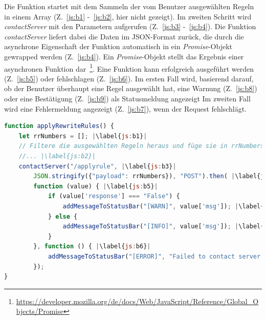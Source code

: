 Die Funktion startet mit dem Sammeln der vom Benutzer ausgewählten Regeln in einem Array (Z.~\ref{js:b1} -~\ref{js:b2}, hier nicht gezeigt).
Im zweiten Schritt wird \textit{contactServer} mit den Parametern aufgerufen (Z.~\ref{js:b3} -~\ref{js:b4}).
Die Funktion \textit{contactServer} liefert dabei die Daten im JSON-Format zurück, die durch die asynchrone Eigenschaft der Funktion automatisch in ein \textit{Promise}-Objekt gewrapped werden (Z.~\ref{js:b4}).
Ein \textit{Promise}-Objekt stellt das Ergebnis einer asynchronen Funktion dar~\footnote{\hspace{1.5mm}\url{https://developer.mozilla.org/de/docs/Web/JavaScript/Reference/Global_Objects/Promise}}.
Eine Funktion kann erfolgreich ausgeführt werden (Z.~\ref{js:b5}) oder fehlschlagen (Z.~\ref{js:b6}). Im ersten Fall wird, basierend darauf, ob der Benutzer überhaupt eine Regel ausgewählt hat,
eine Warnung (Z.~\ref{js:b8}) oder eine Bestätigung (Z.~\ref{js:b9}) als Statusmeldung angezeigt
Im zweiten Fall wird eine Fehlermeldung angezeigt (Z.~\ref{js:b7}), wenn der Request fehlschlägt.

\begin{lstlisting}[language=JavaScript, escapechar=|, caption=Funktion \textit{applyRewriteRules()} aus der Datei \textit{index.js}, label={lst:apply}]
function applyRewriteRules() {
    let rrNumbers = []; |\label{js:b1}|
    // Filtere die ausgewählten Regeln heraus und füge sie in rrNumbers ein
    //... |\label{js:b2}|
    contactServer("/applyrule", |\label{js:b3}|
        JSON.stringify({"payload": rrNumbers}), "POST").then( |\label{js:b4}|
        function (value) { |\label{js:b5}|
            if (value['response'] === "False") {
                addMessageToStatusBar("[WARN]", value['msg']); |\label{js:b8}|
            } else {
                addMessageToStatusBar("[INFO]", value['msg']); |\label{js:b9}|
            }
        }, function () { |\label{js:b6}|
            addMessageToStatusBar("[ERROR]", "Failed to contact server."); |\label{js:b7}|
        }); 
}
\end{lstlisting} 
